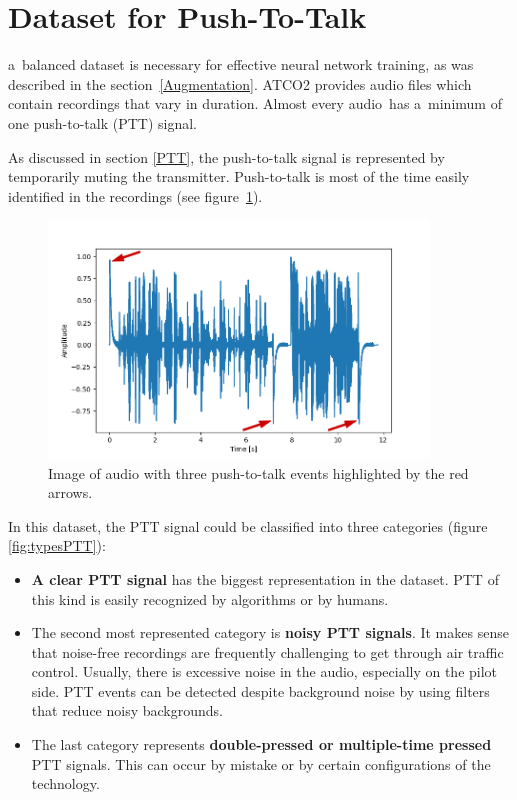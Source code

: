 \newpage

\section{Dataset for Push-To-Talk}\label{Dataset for PTT}

    a~balanced dataset is necessary for effective neural network training, as was described in the section \ref{Augmentation}. ATCO2 provides audio files which contain recordings that vary in duration. Almost every audio has a~minimum of one push-to-talk (PTT) signal. 
    
    As discussed in section \ref{PTT}, the push-to-talk signal is represented by temporarily muting the transmitter. Push-to-talk is most of the time easily identified in the recordings (see figure~\ref{fig:sigPTT}). 


    \begin{figure}[ht!]
        \centering
        \includegraphics[width = 0.9\textwidth]{obrazky-figures/signalwithPTT.png}
        \caption{Image of audio with three push-to-talk events highlighted by the red arrows.}
        \label{fig:sigPTT}
    \end{figure}


    In this dataset, the PTT signal could be classified into three categories (figure \ref{fig:typesPTT}):

    \begin{itemize}
        \item \textbf{A clear PTT signal} has the biggest representation in the dataset. PTT of this kind is easily recognized by algorithms or by humans. 
        \item The second most represented category is \textbf{noisy PTT signals}.
        It makes sense that noise-free recordings are frequently challenging to get through air traffic control. Usually, there is excessive noise in the audio, especially on the pilot side. PTT events can be detected despite background noise by using filters that reduce noisy backgrounds. 
        \item The last category represents \textbf{double-pressed or multiple-time pressed} PTT signals. This can occur by mistake or by certain configurations of the technology.
    \end{itemize}


